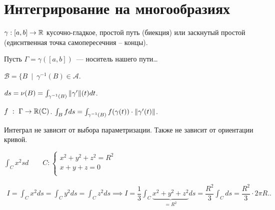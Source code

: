 \section{Интегрирование на многообразиях}

\begin{definition}
    $\gamma: [a,b] \to \mathbb{R}$ кусочно-гладкое, простой путь (биекция) или заскнутый простой (едиснтвенная точка самопересечния -- концы).

    Пусть $\Gamma = \gamma ([a, b])$~--- носитель нашего пути\dots

    $\mathscr{B} = \{ B~\mid~ \gamma^{-1} (B) \in \mathscr{A}$.
    
    $ds = \nu(B) = \int_{\gamma^{-1}(B)} \|\gamma^{\prime}\|(t)dt$.

    $f~:~ \Gamma \to \mathbb{R}(\mathbb{C})$. $\int_B f ds = \int_{\gamma^{-1} (B) } f (\gamma(t)) \cdot \| \gamma^{\prime} (t) \|$.

    Интеграл не зависит от выбора параметризации. Также не зависит от ориентации кривой.
\end{definition}

\begin{example}
    $\int_C x^2sd\qquad C: \begin{cases}
        x^2+y^2+z^2 = R^2\\
         x+y+z = 0\\
    \end{cases}$

    \begin{align*}
        I = \int_C x^2ds = \int_C y^2ds = \int_C z^2ds
        \implies I = \dfrac{1}{3 } \int_C \underbrace{x^2 + y^2 + z^2}_{= R^2} ds = \dfrac{R^2} {3} \int_C ds = \dfrac{R^2} {3} \cdot 2\pi R.
        .\end{align*}
\end{example}

